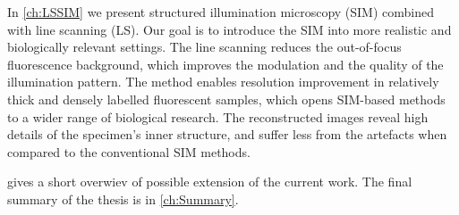 In \autoref{ch:LSSIM} we present structured illumination microscopy (SIM) combined with line scanning (LS). Our goal is to introduce the SIM into more realistic and biologically relevant settings. The line scanning reduces the out-of-focus fluorescence background, which improves the modulation and the quality of the illumination pattern. The method enables resolution improvement in relatively thick and densely labelled fluorescent samples, which opens SIM-based methods to a wider range of biological research. The reconstructed images reveal high details of the specimen's inner structure, and suffer less from the artefacts when compared to the conventional SIM methods.  

 gives a short overwiev of possible extension of the current work. The final summary of the thesis is in \autoref{ch:Summary}. 


